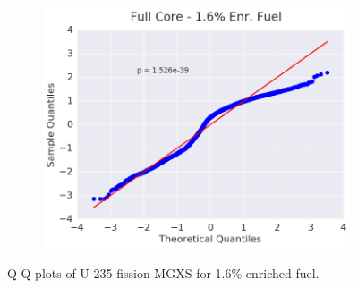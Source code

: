 \begin{figure}[h!]
\begin{subfigure}{0.5\textwidth}
  \includegraphics[width=\linewidth]{figures/patterns/full-core/quantile/16-enr-fiss-2} \caption{}
  \label{fig:chap9-qq-full-core-1.6-fiss}
\end{subfigure}
\caption[Q-Q plots of U-235 fission MGXS for 1.6\% enriched fuel]{Q-Q plots of U-235 fission \ac{MGXS} for 1.6\% enriched fuel.}
\label{fig:chap9-qq-1.6-fiss}
\end{figure}

